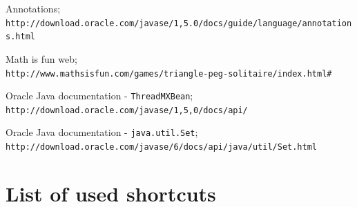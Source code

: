 \documentclass[11pt,twoside,a4paper]{book}
\begin{document}
\begin{thebibliography}{1}
Annotations;\\
\verb|http://download.oracle.com/javase/1,5.0/docs/guide/language/annotations.html|

Math
is fun
web;\\\verb|http://www.mathsisfun.com/games/triangle-peg-solitaire/index.html#|

Oracle Java documentation - \verb|ThreadMXBean|;\\
\verb|http://download.oracle.com/javase/1,5,0/docs/api/|

Oracle Java documentation - \verb|java.util.Set|;\\
\verb|http://download.oracle.com/javase/6/docs/api/java/util/Set.html|

\end{thebibliography}

%




%
{
\def\CS{$\cal C\kern-0.1667em\lower.5ex\hbox{$\cal S$}\kern-0.075em $}

}


%

\appendix



\chapter{List of used shortcuts}
\end{document}

